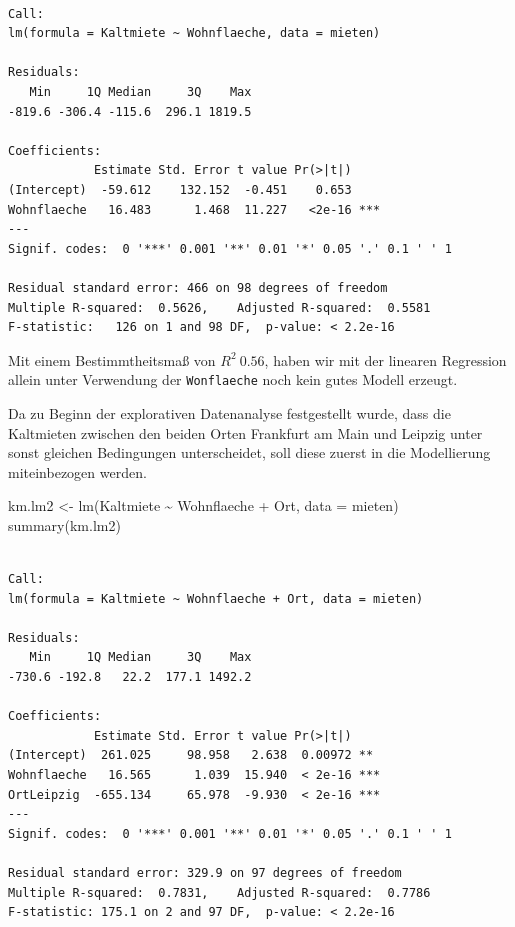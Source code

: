 \documentclass[
  a4paper,
  DIV=11]{scrartcl}
\newenvironment{Shaded}{\begin{snugshade}}{\end{snugshade}}
\newcommand{\AttributeTok}[1]{\textcolor[rgb]{0.40,0.45,0.13}{#1}}
\newcommand{\FunctionTok}[1]{\textcolor[rgb]{0.28,0.35,0.67}{#1}}
\newcommand{\NormalTok}[1]{\textcolor[rgb]{0.00,0.23,0.31}{#1}}
\newcommand{\OtherTok}[1]{\textcolor[rgb]{0.00,0.23,0.31}{#1}}
\newcommand{\SpecialCharTok}[1]{\textcolor[rgb]{0.37,0.37,0.37}{#1}}
\begin{document}
\begin{verbatim}

Call:
lm(formula = Kaltmiete ~ Wohnflaeche, data = mieten)

Residuals:
   Min     1Q Median     3Q    Max 
-819.6 -306.4 -115.6  296.1 1819.5 

Coefficients:
            Estimate Std. Error t value Pr(>|t|)    
(Intercept)  -59.612    132.152  -0.451    0.653    
Wohnflaeche   16.483      1.468  11.227   <2e-16 ***
---
Signif. codes:  0 '***' 0.001 '**' 0.01 '*' 0.05 '.' 0.1 ' ' 1

Residual standard error: 466 on 98 degrees of freedom
Multiple R-squared:  0.5626,    Adjusted R-squared:  0.5581 
F-statistic:   126 on 1 and 98 DF,  p-value: < 2.2e-16
\end{verbatim}

Mit einem Bestimmtheitsmaß von \(R^2 ~ 0.56\), haben wir mit der
linearen Regression allein unter Verwendung der \texttt{Wonflaeche} noch
kein gutes Modell erzeugt.

Da zu Beginn der explorativen Datenanalyse festgestellt wurde, dass die
Kaltmieten zwischen den beiden Orten Frankfurt am Main und Leipzig unter
sonst gleichen Bedingungen unterscheidet, soll diese zuerst in die
Modellierung miteinbezogen werden.

\begin{Shaded}
\begin{Highlighting}[]
\NormalTok{km.lm2 }\OtherTok{\textless{}{-}} \FunctionTok{lm}\NormalTok{(Kaltmiete }\SpecialCharTok{\textasciitilde{}}\NormalTok{ Wohnflaeche }\SpecialCharTok{+}\NormalTok{ Ort, }\AttributeTok{data =}\NormalTok{ mieten)}
\FunctionTok{summary}\NormalTok{(km.lm2)}
\end{Highlighting}
\end{Shaded}

\begin{verbatim}

Call:
lm(formula = Kaltmiete ~ Wohnflaeche + Ort, data = mieten)

Residuals:
   Min     1Q Median     3Q    Max 
-730.6 -192.8   22.2  177.1 1492.2 

Coefficients:
            Estimate Std. Error t value Pr(>|t|)    
(Intercept)  261.025     98.958   2.638  0.00972 ** 
Wohnflaeche   16.565      1.039  15.940  < 2e-16 ***
OrtLeipzig  -655.134     65.978  -9.930  < 2e-16 ***
---
Signif. codes:  0 '***' 0.001 '**' 0.01 '*' 0.05 '.' 0.1 ' ' 1

Residual standard error: 329.9 on 97 degrees of freedom
Multiple R-squared:  0.7831,    Adjusted R-squared:  0.7786 
F-statistic: 175.1 on 2 and 97 DF,  p-value: < 2.2e-16
\end{verbatim}
\end{document}
